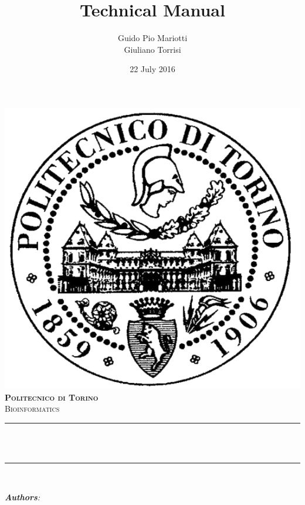 \documentclass[hidelinks,12pt]{article}
\title{Technical Manual}                             %
\author{Guido Pio Mariotti\\Giuliano Torrisi}                               %
\date{22 July 2016}                                           %
\makeatletter
\let\thetitle\@title
\let\theauthor\@author
\let\thedate\@date
\makeatother
\begin{document}

\begin{titlepage}
    \centering
    \vspace*{0.5 cm}
    \includegraphics[scale = 0.35]{polito_logo.png}\\[1.0 cm]   %
    \textsc{\LARGE \textbf{Politecnico di Torino}}\\[2.0 cm]   %
    \textsc{\Large Bioinformatics}\\[0.5 cm]               %
    \rule{\linewidth}{0.2 mm} \\[0.4 cm]
    { \huge \bfseries \thetitle}\\
    \rule{\linewidth}{0.2 mm} \\[1.5 cm]
    \vspace{20 pt}
    \begin{minipage}{1\textwidth}
        \begin{flushright} \large
            \emph{\textbf{Authors}:}\\
            \theauthor
            \end{flushright}
    \end{minipage}\\[2 cm]
    {\large \thedate}\\[2 cm]
 
    \vfill
    
\end{titlepage}
\end{document}
